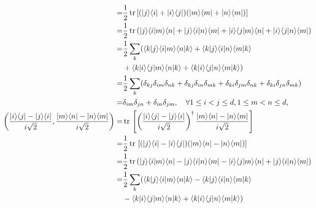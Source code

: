 \documentclass[en]{sol-man}
\begin{document}
\begin{sol}
\begin{itemize}
\begin{itemize}
\begin{align}
                \notag=&\frac{1}{2}\tr[(\lvert j\rangle\langle i\rvert+\lvert i\rangle\langle j\rvert)(\lvert m\rangle\langle m\rvert+\lvert n\rangle\langle m\rvert)]\\
                \notag=&\frac{1}{2}\tr(\lvert j\rangle\langle i\vert m\rangle\langle n\rvert+\lvert j\rangle\langle i\vert n\rangle\langle m\rvert+\lvert i\rangle\langle j\vert m\rangle\langle n\rvert+\lvert i\rangle\langle j\vert n\rangle\langle m\rvert)\\
                \notag=&\frac{1}{2}\sum_k(\langle k\vert j\rangle\langle i\vert m\rangle\langle n\vert k\rangle+\langle k\vert j\rangle\langle i\vert n\rangle\langle m\vert k\rangle\\
                \notag&+\langle k\vert i\rangle\langle j\vert m\rangle\langle n\vert k\rangle+\langle k\vert i\rangle\langle j\vert n\rangle\langle m\vert k\rangle)\\
                \notag=&\frac{1}{2}\sum_k(\delta_{kj}\delta_{im}\delta_{nk}+\delta_{kj}\delta_{in}\delta_{mk}+\delta_{ki}\delta_{jm}\delta_{nk}+\delta_{ki}\delta_{jn}\delta_{mk})\\
                =&\delta_{im}\delta_{jn}+\delta_{in}\delta_{jm},\quad\forall 1\leq i<j\leq d,1\leq m<n\leq d,\\
                \notag\left(\frac{\lvert i\rangle\langle j\rvert-\lvert j\rangle\langle i\rvert}{i\sqrt{2}},\frac{\lvert m\rangle\langle n\rvert-\lvert n\rangle\langle m\rvert}{i\sqrt{2}}\right)=&\tr\left[\left(\frac{\lvert i\rangle\langle j\rvert-\lvert j\rangle\langle i\rvert}{i\sqrt{2}}\right)^{\dagger}\frac{\lvert m\rangle\langle n\rvert-\lvert n\rangle\langle m\rvert}{i\sqrt{2}}\right]\\
                \notag=&\frac{1}{2}\tr\left[(\lvert j\rangle\langle i\rvert-\lvert i\rangle\langle j\rvert)(\lvert m\rangle\langle n\rvert-\lvert n\rangle\langle m\rvert)\right]\\
                \notag=&\frac{1}{2}\tr(\lvert j\rangle\langle i\vert m\rangle\langle n\rvert-\lvert j\rangle\langle i\vert n\rangle\langle m\rvert-\lvert i\rangle\langle j\vert m\rangle\langle n\rvert+\lvert j\rangle\langle i\vert n\rangle\langle m\rvert)\\
                \notag=&\frac{1}{2}\sum_k(\langle k\vert j\rangle\langle i\vert m\rangle\langle n\vert k\rangle-\langle k\vert j\rangle\langle i\vert n\rangle\langle m\vert k\rangle\\
                \notag&-\langle k\vert i\rangle\langle j\vert m\rangle\langle n\vert k\rangle+\langle k\vert i\rangle\langle j\vert n\rangle\langle m\vert k\rangle)\\

\end{align}
\end{itemize}
\end{itemize}
\end{sol}
\end{document}
